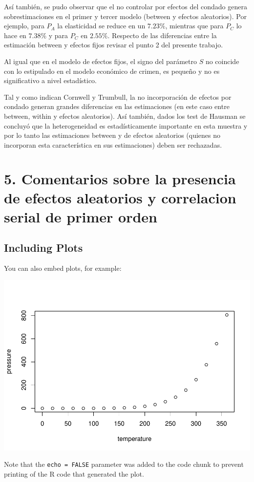\documentclass[
]{article}
\begin{document}
Así también, se pudo observar que el no controlar por efectos del
condado genera sobrestimaciones en el primer y tercer modelo (between y
efectos aleatorios). Por ejemplo, para \(P_A\) la elasticidad se reduce
en un \(7.23\%\), mientras que para \(P_C\) lo hace en \(7.38\%\) y para
\(P_C\) en \(2.55\%\). Respecto de las diferencias entre la estimación
between y efectos fijos revisar el punto 2 del presente trabajo.

Al igual que en el modelo de efectos fijos, el signo del parámetro \(S\)
no coincide con lo estipulado en el modelo económico de crimen, es
pequeño y no es significativo a nivel estadístico.

Tal y como indican Cornwell y Trumbull, la no incorporación de efectos
por condado generan grandes diferencias en las estimaciones (en este
caso entre between, within y efectos aleatorios). Así también, dados los
test de Hausman se concluyó que la heterogeneidad es estadísticamente
importante en esta muestra y por lo tanto las estimaciones between y de
efectos aleatorios (quienes no incorporan esta característica en sus
estimaciones) deben ser rechazadas.

\hypertarget{comentarios-sobre-la-presencia-de-efectos-aleatorios-y-correlacion-serial-de-primer-orden}{%
\section{5. Comentarios sobre la presencia de efectos aleatorios y
correlacion serial de primer
orden}\label{comentarios-sobre-la-presencia-de-efectos-aleatorios-y-correlacion-serial-de-primer-orden}}

\hypertarget{including-plots}{%
\subsection{Including Plots}\label{including-plots}}

You can also embed plots, for example:

\includegraphics{TP2_Econometria_Avanzada_Casiano_Daboin_Quispe--1-_files/figure-latex/pressure-1.pdf}

Note that the \texttt{echo\ =\ FALSE} parameter was added to the code
chunk to prevent printing of the R code that generated the plot.
\end{document}
